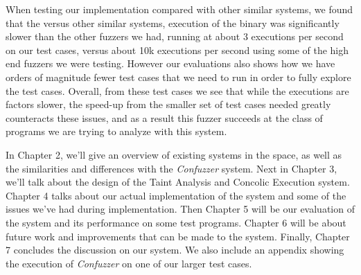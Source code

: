 When testing our implementation compared with other similar systems, we found
that the versus other similar systems, execution of the binary was significantly
slower than the other fuzzers we had, running at about 3 executions per second
on our test cases, versus about 10k executions per second using some of the high
end fuzzers we were testing. However our evaluations also shows how we have
orders of magnitude fewer test cases that we need to run in order to fully
explore the test cases. Overall, from these test cases we see that while the
executions are factors slower, the speed-up from the smaller set of test cases
needed greatly counteracts these issues, and as a result this fuzzer succeeds at
the class of programs we are trying to analyze with this system.

In Chapter 2, we'll give an overview of existing systems in the space, as well
as the similarities and differences with the \textit{Confuzzer} system. Next in
Chapter 3, we'll talk about the design of the Taint Analysis and Concolic
Execution system. Chapter 4 talks about our actual implementation of the system
and some of the issues we've had during implementation. Then Chapter 5 will be
our evaluation of the system and its performance on some test programs. Chapter
6 will be about future work and improvements that can be made to the
system. Finally, Chapter 7 concludes the discussion on our system. We also
include an appendix showing the execution of \textit{Confuzzer} on one of our
larger test cases.
